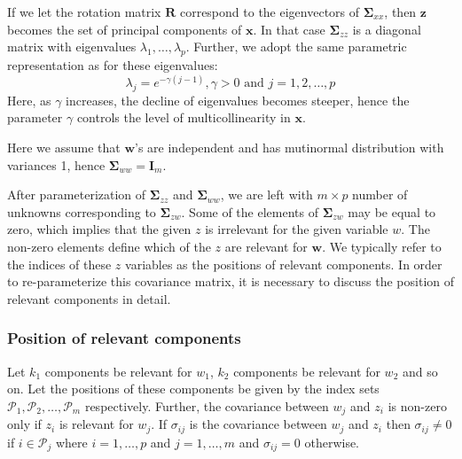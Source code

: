 \documentclass[review]{elsarticle}
\providecommand{\tightlist}{%
  \setlength{\itemsep}{0pt}\setlength{\parskip}{0pt}}
\theoremstyle{definition}
\theoremstyle{definition}
\theoremstyle{remark}
\begin{document}
\begin{description}
\tightlist
\item[\textbf{Parameterization of \(\boldsymbol{\Sigma}_{zz}\)}]
If we let the rotation matrix \(\mathbf{R}\) correspond to the
eigenvectors of \(\boldsymbol{\Sigma}_{xx}\), then \(\mathbf{z}\)
becomes the set of principal components of \(\mathbf{x}\). In that case
\(\boldsymbol{\Sigma}_{zz}\) is a diagonal matrix with eigenvalues
\(\lambda_1, \ldots, \lambda_p\). Further, we adopt the same parametric
representation as \citet{saebo2015simrel} for these eigenvalues:
\[\lambda_j = e^{-\gamma(j - 1)}, \gamma >0 \text{ and } j = 1, 2, \ldots, p\]
Here, as \(\gamma\) increases, the decline of eigenvalues becomes
steeper, hence the parameter \(\gamma\) controls the level of
multicollinearity in \(\mathbf{x}\).
\item[\textbf{Parameterization of \(\boldsymbol{\Sigma}_{ww}\)}]
Here we assume that \(\mathbf{w}\)'s are independent and has mutinormal
distribution with variances 1, hence
\(\boldsymbol{\Sigma}_{ww} = \mathbf{I}_m\).
\item[\textbf{Parameterization of \(\boldsymbol{\Sigma}_{zw}\)}]
After parameterization of \(\boldsymbol{\Sigma}_{zz}\) and
\(\boldsymbol{\Sigma}_{ww}\), we are left with \(m \times p\) number of
unknowns corresponding to \(\boldsymbol{\Sigma}_{zw}\). Some of the
elements of \(\boldsymbol{\Sigma}_{zw}\) may be equal to zero, which
implies that the given \(z\) is irrelevant for the given variable \(w\).
The non-zero elements define which of the \(z\) are relevant for
\(\mathbf{w}\). We typically refer to the indices of these \(z\)
variables as the positions of relevant components. In order to
re-parameterize this covariance matrix, it is necessary to discuss the
position of relevant components in detail.
\end{description}

\subsubsection{Position of relevant
components}\label{position-of-relevant-components}

Let \(k_1\) components be relevant for \(w_1\), \(k_2\) components be
relevant for \(w_2\) and so on. Let the positions of these components be
given by the index sets
\(\mathcal{P}_1, \mathcal{P}_2, \ldots, \mathcal{P}_m\) respectively.
Further, the covariance between \(w_j\) and \(z_i\) is non-zero only if
\(z_i\) is relevant for \(w_j\). If \(\sigma_{ij}\) is the covariance
between \(w_j\) and \(z_i\) then \(\sigma_{ij} \ne 0\) if
\(i \in \mathcal{P}_j\) where \(i = 1, \ldots, p\) and
\(j = 1, \ldots, m\) and \(\sigma_{ij} = 0\) otherwise.
\end{document}
